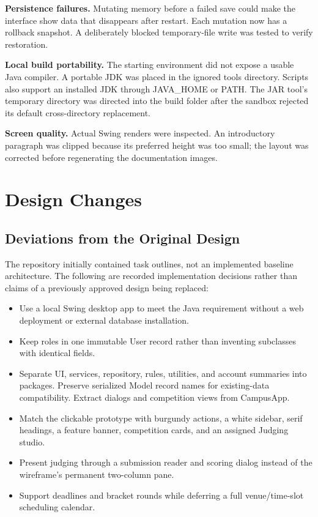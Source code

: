 \textbf{Persistence failures.} Mutating memory before a failed save could make the interface show data that disappears after restart. Each mutation now has a rollback snapshot. A deliberately blocked temporary-file write was tested to verify restoration.

\textbf{Local build portability.} The starting environment did not expose a usable Java compiler. A portable JDK was placed in the ignored tools directory. Scripts also support an installed JDK through JAVA\_HOME or PATH. The JAR tool's temporary directory was directed into the build folder after the sandbox rejected its default cross-directory replacement.

\textbf{Screen quality.} Actual Swing renders were inspected. An introductory paragraph was clipped because its preferred height was too small; the layout was corrected before regenerating the documentation images.

\section{Design Changes}
\subsection{Deviations from the Original Design}
The repository initially contained task outlines, not an implemented baseline architecture. The following are recorded implementation decisions rather than claims of a previously approved design being replaced:
\begin{itemize}
\item Use a local Swing desktop app to meet the Java requirement without a web deployment or external database installation.
\item Keep roles in one immutable User record rather than inventing subclasses with identical fields.
\item Separate UI, services, repository, rules, utilities, and account summaries into packages. Preserve serialized Model record names for existing-data compatibility. Extract dialogs and competition views from CampusApp.
\item Match the clickable prototype with burgundy actions, a white sidebar, serif headings, a feature banner, competition cards, and an assigned Judging studio.
\item Present judging through a submission reader and scoring dialog instead of the wireframe's permanent two-column pane.
\item Support deadlines and bracket rounds while deferring a full venue/time-slot scheduling calendar.
\end{itemize}
